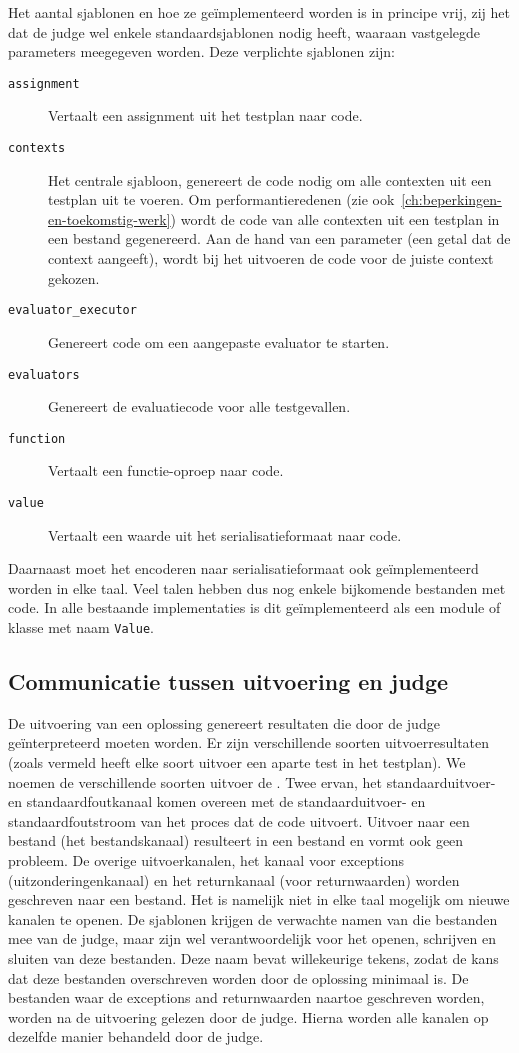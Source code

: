 Het aantal sjablonen en hoe ze geïmplementeerd worden is in principe vrij, zij het dat de judge wel enkele standaardsjablonen nodig heeft, waaraan vastgelegde parameters meegegeven worden.
Deze verplichte sjablonen zijn:
\begin{description}
    \item[\texttt{assignment}] Vertaalt een assignment uit het testplan naar code.
    \item[\texttt{contexts}] Het centrale sjabloon, genereert de code nodig om alle contexten uit een testplan uit te voeren.
    Om performantieredenen (zie ook~\cref{ch:beperkingen-en-toekomstig-werk}) wordt de code van alle contexten uit een testplan in een bestand gegenereerd.
    Aan de hand van een parameter (een getal dat de context aangeeft), wordt bij het uitvoeren de code voor de juiste context gekozen.
    \item[\texttt{evaluator\_executor}] Genereert code om een aangepaste evaluator te starten.
    \item[\texttt{evaluators}] Genereert de evaluatiecode voor alle testgevallen.
    \item[\texttt{function}] Vertaalt een functie-oproep naar code.
    \item[\texttt{value}] Vertaalt een waarde uit het serialisatieformaat naar code.
\end{description}

Daarnaast moet het encoderen naar serialisatieformaat ook geïmplementeerd worden in elke taal.
Veel talen hebben dus nog enkele bijkomende bestanden met code.
In alle bestaande implementaties is dit geïmplementeerd als een module of klasse met naam \texttt{Value}.

\subsection{Communicatie tussen uitvoering en judge}\label{subsec:communicatie-tussen-uitvoering-en-judge}

De uitvoering van een oplossing genereert resultaten die door de judge geïnterpreteerd moeten worden.
Er zijn verschillende soorten uitvoerresultaten (zoals vermeld heeft elke soort uitvoer een aparte test in het testplan).
We noemen de verschillende soorten uitvoer de .
Twee ervan, het standaarduitvoer- en standaardfoutkanaal komen overeen met de standaarduitvoer- en standaardfoutstroom van het proces dat de code uitvoert.
Uitvoer naar een bestand (het bestandskanaal) resulteert in een bestand en vormt ook geen probleem.
De overige uitvoerkanalen, het kanaal voor exceptions (uitzonderingenkanaal) en het returnkanaal (voor returnwaarden) worden geschreven naar een bestand.
Het is namelijk niet in elke taal mogelijk om nieuwe kanalen te openen.
De sjablonen krijgen de verwachte namen van die bestanden mee van de judge, maar zijn wel verantwoordelijk voor het openen, schrijven en sluiten van deze bestanden.
Deze naam bevat willekeurige tekens, zodat de kans dat deze bestanden overschreven worden door de oplossing minimaal is.
De bestanden waar de exceptions and returnwaarden naartoe geschreven worden, worden na de uitvoering gelezen door de judge.
Hierna worden alle kanalen op dezelfde manier behandeld door de judge.


